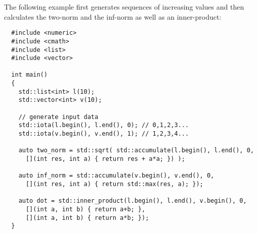\begin{example}
  The following example first generates sequences of increasing values and then calculates the two-norm and the inf-norm as well as
  an inner-product:
  \begin{verbatim}
  #include <numeric>
  #include <cmath>
  #include <list>
  #include <vector>

  int main()
  {
    std::list<int> l(10);
    std::vector<int> v(10);

    // generate input data
    std::iota(l.begin(), l.end(), 0); // 0,1,2,3...
    std::iota(v.begin(), v.end(), 1); // 1,2,3,4...

    auto two_norm = std::sqrt( std::accumulate(l.begin(), l.end(), 0,
      [](int res, int a) { return res + a*a; }) );

    auto inf_norm = std::accumulate(v.begin(), v.end(), 0,
      [](int res, int a) { return std::max(res, a); });

    auto dot = std::inner_product(l.begin(), l.end(), v.begin(), 0,
      [](int a, int b) { return a+b; },
      [](int a, int b) { return a*b; });
  }
  \end{verbatim}
\end{example}

